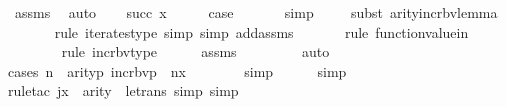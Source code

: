 \begin{isabellebody}
\ assms\ \isamarkupfalse%
\ auto\isanewline
{}\isamarkupfalse%
\isanewline
\ \ \isamarkupfalse%
\ {\isacharparenleft}{\kern0pt}succ\ x{\isacharparenright}{\kern0pt}\isanewline
\ \ \isamarkupfalse%
\ \isamarkupfalse%
\ {\isacharquery}{\kern0pt}case\ \isanewline
\ \ \ \ \isamarkupfalse%
\ simp\isanewline
\ \ \ \ \isamarkupfalse%
{\isacharparenleft}{\kern0pt}subst\ arity{\isacharunderscore}{\kern0pt}incr{\isacharunderscore}{\kern0pt}bv{\isacharunderscore}{\kern0pt}lemma{\isacharparenright}{\kern0pt}\isanewline
\ \ \ \ \ \ \isamarkupfalse%
{\isacharparenleft}{\kern0pt}rule\ iterates{\isacharunderscore}{\kern0pt}type{\isacharcomma}{\kern0pt}\ simp{\isacharcomma}{\kern0pt}\ simp\ add{\isacharcolon}{\kern0pt}assms{\isacharparenright}{\kern0pt}\isanewline
\ \ \ \ \ \ \isamarkupfalse%
{\isacharparenleft}{\kern0pt}rule\ function{\isacharunderscore}{\kern0pt}value{\isacharunderscore}{\kern0pt}in{\isacharparenright}{\kern0pt}\isanewline
\ \ \ \ \ \ \ \isamarkupfalse%
{\isacharparenleft}{\kern0pt}rule\ incr{\isacharunderscore}{\kern0pt}bv{\isacharunderscore}{\kern0pt}type{\isacharparenright}{\kern0pt}\isanewline
\ \ \ \ \isamarkupfalse%
\ assms\isanewline
\ \ \ \ \ \ \ \isamarkupfalse%
\ auto{\isacharbrackleft}{\kern0pt}{}{\isacharbrackright}{\kern0pt}\isanewline
\ \ \ \ \isamarkupfalse%
{\isacharparenleft}{\kern0pt}cases\ {\isachardoublequoteopen}n\ {\isacharless}{\kern0pt}\ arity{\isacharparenleft}{\kern0pt}{\isacharparenleft}{\kern0pt}{\isasymlambda}p{\isachardot}{\kern0pt}\ incr{\isacharunderscore}{\kern0pt}bv{\isacharparenleft}{\kern0pt}p{\isacharparenright}{\kern0pt}\ {\isacharbackquote}{\kern0pt}\ n{\isacharparenright}{\kern0pt}{\isacharcircum}{\kern0pt}x\ {\isacharparenleft}{\kern0pt}{\isasymphi}{\isacharparenright}{\kern0pt}{\isacharparenright}{\kern0pt}{\isachardoublequoteclose}{\isacharparenright}{\kern0pt}\isanewline
\ \ \ \ \ \isamarkupfalse%
\ simp\isanewline
\ \ \ \ \isamarkupfalse%
\ simp\isanewline
\ \ \ \ \isamarkupfalse%
{\isacharparenleft}{\kern0pt}rule{\isacharunderscore}{\kern0pt}tac\ j{\isacharequal}{\kern0pt}{\isachardoublequoteopen}x\ {\isacharhash}{\kern0pt}{\isacharplus}{\kern0pt}\ arity{\isacharparenleft}{\kern0pt}{\isasymphi}{\isacharparenright}{\kern0pt}{\isachardoublequoteclose}\ \ le{\isacharunderscore}{\kern0pt}trans{\isacharcomma}{\kern0pt}\ simp{\isacharcomma}{\kern0pt}\ simp{\isacharparenright}{\kern0pt}\isanewline

\end{isabellebody}

